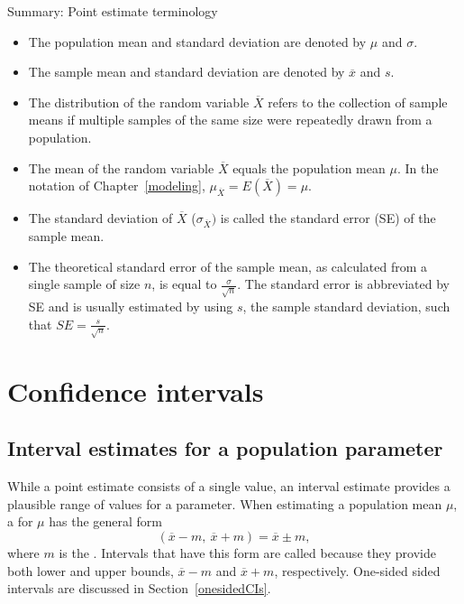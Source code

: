 \begin{onebox}{Summary: Point estimate terminology}
\begin{itemize}
	\setlength{\itemsep}{0mm}
	\item The population mean and standard deviation are denoted by $\mu$ and $\sigma$.
	\item The sample mean and standard deviation are denoted by $\overline{x}$ and $s$.
	\item The distribution of the random variable $\overline{X}$ refers to the collection of sample means if multiple samples of the same size were repeatedly drawn from a population.
	\item The mean of the random variable $\overline{X}$ equals the population mean $\mu$. In the notation of Chapter~\ref{modeling}, $\mu_{\overline{X}} = E(\overline{X}) = \mu$.
	\item  The standard deviation of $\overline{X}$ ($\sigma_{\overline{X}})$ is called the standard error (SE) of the sample mean.
	\item The theoretical standard error of the sample mean, as calculated from a single sample of size $n$, is equal to $\frac{\sigma}{\sqrt{n}}$. The standard error is abbreviated by SE and is usually estimated by using $s$, the sample standard deviation, such that $SE = \frac{s}{\sqrt{n}}$.
\end{itemize}
\end{onebox}



\section{Confidence intervals}
\label{confidenceIntervals}

\subsection{Interval estimates for a population parameter}

While a point estimate consists of a single value, an interval estimate provides a plausible range of values for a parameter. When estimating a population mean $\mu$, a  for $\mu$ has the general form
\[(\overline{x} -m, \ \overline{x} + m) = \overline{x} \pm m, \]
where $m$ is the . Intervals that have this form are called  because they provide both lower and upper bounds, $\overline{x} - m$ and $\overline{x} + m$, respectively. One-sided sided intervals are discussed in Section~\ref{onesidedCIs}.

